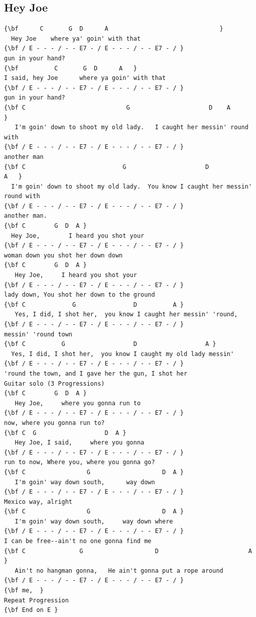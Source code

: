 \documentclass[a4paper]{article}
\begin{document}
\subsection{Hey Joe} %
\label{sub:Hey Joe}
\begin{Verbatim}[commandchars=\\\{\}]
{\bf 	  C       G  D      A                               }
  Hey Joe    where ya' goin' with that  
{\bf / E - - - / - - E7 - / E - - - / - - E7 - / }
gun in your hand? 
{\bf          C       G  D      A   }
I said, hey Joe      where ya goin' with that  
{\bf / E - - - / - - E7 - / E - - - / - - E7 - / }
gun in your hand?  
{\bf C                            G                      D    A                            }
   I'm goin' down to shoot my old lady.   I caught her messin' round with  
{\bf / E - - - / - - E7 - / E - - - / - - E7 - / }
another man  
{\bf C                           G                      D                    A   }
  I'm goin' down to shoot my old lady.  You know I caught her messin' round with  
{\bf / E - - - / - - E7 - / E - - - / - - E7 - / }
another man. 
{\bf C        G  D  A }
  Hey Joe,        I heard you shot your 
{\bf / E - - - / - - E7 - / E - - - / - - E7 - / }
woman down you shot her down down 
{\bf C        G  D  A }
   Hey Joe,     I heard you shot your  
{\bf / E - - - / - - E7 - / E - - - / - - E7 - / }
lady down, You shot her down to the ground 
{\bf C             G                D          A }
   Yes, I did, I shot her,  you know I caught her messin' 'round,  
{\bf / E - - - / - - E7 - / E - - - / - - E7 - / }
messin' 'round town 
{\bf C          G                   D                   A }
  Yes, I did, I shot her,  you know I caught my old lady messin'  
{\bf / E - - - / - - E7 - / E - - - / - - E7 - / }
'round the town, and I gave her the gun, I shot her 
Guitar solo (3 Progressions) 
{\bf C        G  D  A }
   Hey Joe,     where you gonna run to  
{\bf / E - - - / - - E7 - / E - - - / - - E7 - / }
now, where you gonna run to? 
{\bf C  G                   D  A }
   Hey Joe, I said,     where you gonna  
{\bf / E - - - / - - E7 - / E - - - / - - E7 - / }
run to now, Where you, where you gonna go? 
{\bf C                 G                    D  A }
   I'm goin' way down south,      way down  
{\bf / E - - - / - - E7 - / E - - - / - - E7 - / }
Mexico way, alright 
{\bf C                 G                    D  A }
   I'm goin' way down south,     way down where  
{\bf / E - - - / - - E7 - / E - - - / - - E7 - / }
I can be free--ain't no one gonna find me 
{\bf C               G                    D                         A }
   Ain't no hangman gonna,   He ain't gonna put a rope around  
{\bf / E - - - / - - E7 - / E - - - / - - E7 - / }
{\bf me,  }
Repeat Progression 
{\bf End on E }
\end{Verbatim}
\newpage
\end{document}
